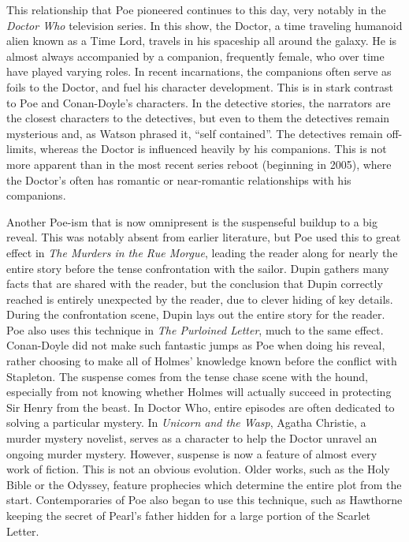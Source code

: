 \documentclass[12pt]{article}
\begin{document}
This relationship that Poe pioneered continues to this day, very notably in
the \emph{Doctor Who} television series. In this show, the Doctor, a time
traveling humanoid alien known as a Time Lord, travels in his spaceship all
around the galaxy. He is almost always accompanied by a companion, frequently
female, who over time have played varying roles. In recent incarnations, the
companions often serve as foils to the Doctor, and fuel his character
development. This is in stark contrast to Poe and Conan-Doyle's characters. In
the detective stories, the narrators are the closest characters to the
detectives, but even to them the detectives remain mysterious and, as Watson
phrased it, ``self contained''. The detectives remain off-limits, whereas the
Doctor is influenced heavily by his companions. This is not more apparent than
in the most recent series reboot (beginning in 2005), where the Doctor's often
has romantic or near-romantic relationships with his companions.

Another Poe-ism that is now omnipresent is the suspenseful buildup to a big
reveal. This was notably absent from earlier literature, but Poe used this to
great effect in \emph{The Murders in the Rue Morgue}, leading the reader along
for nearly the entire story before the tense confrontation with the sailor.
Dupin gathers many facts that are shared with the reader, but the conclusion
that Dupin correctly reached is entirely unexpected by the reader, due to
clever hiding of key details. During the confrontation scene, Dupin lays out
the entire story for the reader. Poe also uses this technique in \emph{The
Purloined Letter}, much to the same effect. Conan-Doyle did not make such
fantastic jumps as Poe when doing his reveal, rather choosing to make all of
Holmes' knowledge known before the conflict with Stapleton. The suspense comes
from the tense chase scene with the hound, especially from not knowing whether
Holmes will actually succeed in protecting Sir Henry from the beast. In Doctor
Who, entire episodes are often dedicated to solving a particular mystery. In
\emph{Unicorn and the Wasp}, Agatha Christie, a murder mystery novelist,
serves as a character to help the Doctor unravel an ongoing murder mystery.
However, suspense is now a feature of almost every work of fiction. This is
not an obvious evolution. Older works, such as the Holy Bible or the Odyssey,
feature prophecies which determine the entire plot from the start.
Contemporaries of Poe also began to use this technique, such as Hawthorne
keeping the secret of Pearl's father hidden for a large portion of the Scarlet
Letter.
\end{document}
